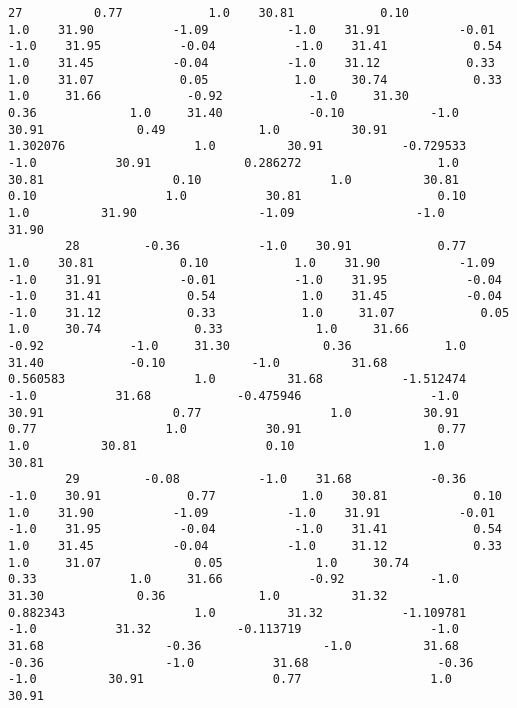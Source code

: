\documentclass[11pt]{article}
\begin{document}
\begin{Verbatim}[commandchars=\\\{\}]
        27          0.77            1.0    30.81            0.10            1.0    31.90           -1.09           -1.0    31.91           -0.01           -1.0    31.95           -0.04           -1.0    31.41            0.54            1.0    31.45           -0.04           -1.0    31.12            0.33            1.0    31.07            0.05            1.0     30.74            0.33             1.0     31.66            -0.92            -1.0     31.30             0.36             1.0     31.40            -0.10            -1.0     30.91             0.49             1.0          30.91            1.302076                  1.0          30.91           -0.729533                 -1.0           30.91             0.286272                   1.0          30.81                  0.10                  1.0          30.81                  0.10                  1.0           30.81                   0.10                   1.0          31.90                 -1.09                 -1.0          31.90   
        28         -0.36           -1.0    30.91            0.77            1.0    30.81            0.10            1.0    31.90           -1.09           -1.0    31.91           -0.01           -1.0    31.95           -0.04           -1.0    31.41            0.54            1.0    31.45           -0.04           -1.0    31.12            0.33            1.0     31.07            0.05             1.0     30.74             0.33             1.0     31.66            -0.92            -1.0     31.30             0.36             1.0     31.40            -0.10            -1.0          31.68            0.560583                  1.0          31.68           -1.512474                 -1.0           31.68            -0.475946                  -1.0          30.91                  0.77                  1.0          30.91                  0.77                  1.0           30.91                   0.77                   1.0          30.81                  0.10                  1.0          30.81   
        29         -0.08           -1.0    31.68           -0.36           -1.0    30.91            0.77            1.0    30.81            0.10            1.0    31.90           -1.09           -1.0    31.91           -0.01           -1.0    31.95           -0.04           -1.0    31.41            0.54            1.0    31.45           -0.04           -1.0     31.12            0.33             1.0     31.07             0.05             1.0     30.74             0.33             1.0     31.66            -0.92            -1.0     31.30             0.36             1.0          31.32            0.882343                  1.0          31.32           -1.109781                 -1.0           31.32            -0.113719                  -1.0          31.68                 -0.36                 -1.0          31.68                 -0.36                 -1.0           31.68                  -0.36                  -1.0          30.91                  0.77                  1.0          30.91   

\end{Verbatim}
\end{document}
